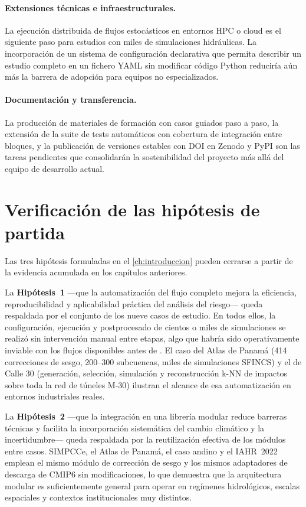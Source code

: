 \paragraph{Extensiones técnicas e infraestructurales.}
La ejecución distribuida de flujos estocásticos en entornos HPC o cloud es el siguiente paso para estudios con miles de simulaciones hidráulicas. La incorporación de un sistema de configuración declarativa que permita describir un estudio completo en un fichero YAML sin modificar código Python reduciría aún más la barrera de adopción para equipos no especializados.

\paragraph{Documentación y transferencia.}
La producción de materiales de formación con casos guiados paso a paso, la extensión de la suite de tests automáticos con cobertura de integración entre bloques, y la publicación de versiones estables con DOI en Zenodo y PyPI son las tareas pendientes que consolidarán la sostenibilidad del proyecto más allá del equipo de desarrollo actual.

\section{Verificación de las hipótesis de partida}
\label{sec:verificacion_hipotesis}

Las tres hipótesis formuladas en el \cref{ch:introduccion} pueden cerrarse a partir de la evidencia acumulada en los capítulos anteriores.

La \textbf{Hipótesis~1} ---que la automatización del flujo completo mejora la eficiencia, reproducibilidad y aplicabilidad práctica del análisis del riesgo--- queda respaldada por el conjunto de los nueve casos de estudio. En todos ellos, la configuración, ejecución y postprocesado de cientos o miles de simulaciones se realizó sin intervención manual entre etapas, algo que habría sido operativamente inviable con los flujos disponibles antes de \hydra. El caso del Atlas de Panamá (414 correcciones de sesgo, 200--300 subcuencas, miles de simulaciones SFINCS) y el de Calle 30 (generación, selección, simulación y reconstrucción k-NN de impactos sobre toda la red de túneles M-30) ilustran el alcance de esa automatización en entornos industriales reales.

La \textbf{Hipótesis~2} ---que la integración en una librería modular reduce barreras técnicas y facilita la incorporación sistemática del cambio climático y la incertidumbre--- queda respaldada por la reutilización efectiva de los módulos entre casos. SIMPCCe, el Atlas de Panamá, el caso andino y el IAHR~2022 emplean el mismo módulo de corrección de sesgo y los mismos adaptadores de descarga de CMIP6 sin modificaciones, lo que demuestra que la arquitectura modular es suficientemente general para operar en regímenes hidrológicos, escalas espaciales y contextos institucionales muy distintos.

